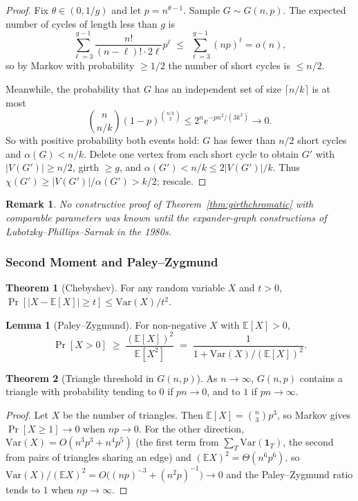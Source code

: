 \documentclass{article}
\newtheorem{remark}{Remark}
\theoremstyle{definition}
\newtheorem{theorem}{Theorem}
\newtheorem{lemma}{Lemma}
\begin{document}
\begin{proof}
Fix $\theta \in (0, 1/g)$ and let $p = n^{\theta - 1}$. Sample
$G \sim G(n, p)$. The expected number of cycles of length less than
$g$ is
\[
  \sum_{\ell = 3}^{g - 1} \frac{n!}{(n - \ell)! \cdot 2\ell} p^\ell
  \;\le\; \sum_{\ell = 3}^{g - 1} (np)^\ell = o(n),
\]
so by Markov with probability $\ge 1/2$ the number of short cycles is
$\le n/2$.

Meanwhile, the probability that $G$ has an independent set of size
$\lceil n/k \rceil$ is at most
\[
  \binom{n}{n/k} (1 - p)^{\binom{n/k}{2}} \le 2^n e^{-p n^2/(3 k^2)} \to 0.
\]
So with positive probability both events hold: $G$ has fewer than
$n/2$ short cycles and $\alpha(G) < n/k$. Delete one vertex from each
short cycle to obtain $G'$ with $|V(G')| \ge n/2$, girth $\ge g$, and
$\alpha(G') < n/k \le 2|V(G')|/k$. Thus $\chi(G') \ge |V(G')|/\alpha(G') > k/2$;
rescale.
\end{proof}

\begin{remark}
No constructive proof of Theorem~\ref{thm:girthchromatic} with
comparable parameters was known until the expander-graph constructions
of Lubotzky--Phillips--Sarnak in the 1980s.
\end{remark}

\subsubsection{Second Moment and Paley--Zygmund}

\begin{theorem}[Chebyshev]\label{thm:chebyshev}
For any random variable $X$ and $t > 0$,
$\Pr[|X - \mathbb{E}[X]| \ge t] \le \mathrm{Var}(X)/t^2$.
\end{theorem}

\begin{lemma}[Paley--Zygmund]
For non-negative $X$ with $\mathbb{E}[X] > 0$,
\[
  \Pr[X > 0] \;\ge\; \frac{(\mathbb{E}[X])^2}{\mathbb{E}[X^2]}
  \;=\; \frac{1}{1 + \mathrm{Var}(X)/(\mathbb{E}[X])^2}.
\]
\end{lemma}

\begin{theorem}[Triangle threshold in $G(n, p)$]\label{thm:trianglethresh}
As $n \to \infty$, $G(n, p)$ contains a triangle with probability
tending to $0$ if $pn \to 0$, and to $1$ if $pn \to \infty$.
\end{theorem}

\begin{proof}
Let $X$ be the number of triangles. Then $\mathbb{E}[X] = \binom{n}{3} p^3$,
so Markov gives $\Pr[X \ge 1] \to 0$ when $np \to 0$. For the other
direction, $\mathrm{Var}(X) = O(n^3 p^3 + n^4 p^5)$ (the first term
from $\sum_T \mathrm{Var}(\mathbf 1_T)$, the second from pairs of
triangles sharing an edge) and $(\mathbb{E} X)^2 = \Theta(n^6 p^6)$, so
$\mathrm{Var}(X)/(\mathbb{E}X)^2 = O\big((np)^{-3} + (n^2 p)^{-1}\big) \to 0$
and the Paley--Zygmund ratio tends to $1$ when $np \to \infty$.
\end{proof}
\end{document}
